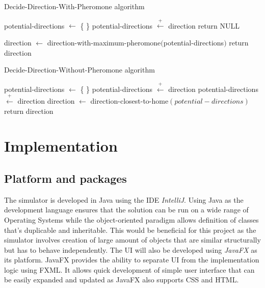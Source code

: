 \documentclass[a4paper, oneside, 11pt]{report}
\begin{document}
\begin{algorithm}[th]
	\caption{ Decide-Direction-With-Pheromone algorithm}  \label{Algorithm:Home_Pheromone}
	\begin{algorithmic}[1]
		\State potential-directions $\leftarrow$ \{ \}
						\State potential-directions $\overset{+}{\leftarrow}$ direction
					\EndIf
				\EndIf
			\EndIf
		\EndWhile
			\State return NULL
		
		\Else
			\State direction $\leftarrow$ direction-with-maximum-pheromone$($potential-directions$)$
			\State return direction
		\EndIf
	\end{algorithmic}
\end{algorithm}

\begin{algorithm}[th]
	\caption{ Decide-Direction-Without-Pheromone algorithm}
	 \label{Algorithm:Home_Distance}
	\begin{algorithmic}[1]
		\State potential-directions $\leftarrow$ \{ \}
				\State potential-directions $\overset{+}{\leftarrow}$ direction
				\State potential-directions $\overset{+}{\leftarrow}$ direction
			\EndIf
		\EndIf
		\EndWhile
		\State direction $\leftarrow$ direction-closest-to-home$(potential-directions)$
		\State return direction
	\end{algorithmic}
\end{algorithm}

\chapter{Implementation}
\label{chap:Implementation}
\section{Platform and packages}
The simulator is developed in Java using the IDE \textit{IntelliJ}. Using Java as the development language ensures that the solution can be run on a wide range of Operating Systems while the object-oriented paradigm allows definition of classes that's duplicable and inheritable. This would be beneficial for this project as the simulator involves creation of large amount of objects that are similar structurally but has to behave independently. The UI will also be developed using \textit{JavaFX} as its platform. JavaFX provides the ability to separate UI from the implementation logic using FXML. It allows quick development of simple user interface that can be easily expanded and updated as JavaFX also supports CSS and HTML.
\end{document}
